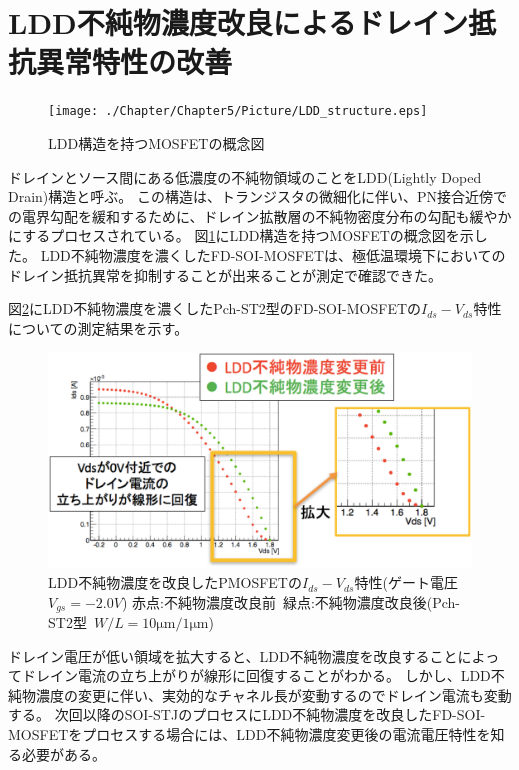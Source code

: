 	\section{LDD不純物濃度改良によるドレイン抵抗異常特性の改善}
		\begin{figure}[htbp]
			\begin{center}
				\texttt{[image: ./Chapter/Chapter5/Picture/LDD\_structure.eps]}
				\caption{LDD構造を持つMOSFETの概念図}
				\label{fig:LDD_structure}
			\end{center}
		\end{figure}
		ドレインとソース間にある低濃度の不純物領域のことをLDD(Lightly Doped Drain)構造と呼ぶ。
		この構造は、トランジスタの微細化に伴い、PN接合近傍での電界勾配を緩和するために、ドレイン拡散層の不純物密度分布の勾配も緩やかにするプロセスされている。
		図\ref{fig:LDD_structure}にLDD構造を持つMOSFETの概念図を示した。		
		LDD不純物濃度を濃くしたFD-SOI-MOSFETは、極低温環境下においてのドレイン抵抗異常を抑制することが出来ることが測定で確認できた。
		
		図\ref{fig:LDD_IdVd_P}にLDD不純物濃度を濃くしたPch-ST2型のFD-SOI-MOSFETの$I_{ds}-V_{ds}$特性についての測定結果を示す。
		\begin{figure}[htbp]
			\begin{center}
				\includegraphics[clip,width=15.0cm]{./Chapter/Chapter5/Picture/LDD_Pch_IdVd_m2.0_W10L1.eps}
				\caption{LDD不純物濃度を改良したPMOSFETの$I_{ds}-V_{ds}$特性(ゲート電圧$V_{gs}=-2.0V$)
					\newline 赤点:不純物濃度改良前\ 緑点:不純物濃度改良後(Pch-ST2型\ $W/L=10\mathrm{\mu m}/1\mathrm{\mu m}$)}
				\label{fig:LDD_IdVd_P}
			\end{center}
		\end{figure}
		
		ドレイン電圧が低い領域を拡大すると、LDD不純物濃度を改良することによってドレイン電流の立ち上がりが線形に回復することがわかる。
		しかし、LDD不純物濃度の変更に伴い、実効的なチャネル長が変動するのでドレイン電流も変動する。
		次回以降のSOI-STJのプロセスにLDD不純物濃度を改良したFD-SOI-MOSFETをプロセスする場合には、LDD不純物濃度変更後の電流電圧特性を知る必要がある。
		
